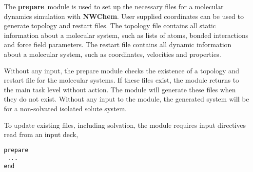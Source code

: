 \label{sec:prepare}
\def\bmu{\mbox{\boldmath $\mu$}}
\def\bE{\mbox{\bf E}}
\def\br{\mbox{\bf r}}
\def\tT{\tilde{T}}
\def\t{\tilde{1}}
\def\ip{i\prime}
\def\jp{j\prime}
\def\ipp{i\prime\prime}
\def\jpp{j\prime\prime}
\def\etal{{\sl et al.}}
\def\nwchem{{\bf NWChem}}
\def\nwargos{{\bf nwargos}}
\def\nwtop{{\bf nwtop}}
\def\nwrst{{\bf nwrst}}
\def\nwsgm{{\bf nwsgm}}
\def\esp{{\bf esp}}
\def\md{{\bf md}}
\def\prepare{{\bf prepare}}
\def\argos{{\bf ARGOS}}
\def\amber{{\bf AMBER}}
\def\charmm{{\bf CHARMM}}

The \prepare\ module is used to set up the necessary files for a molecular
dynamics simulation with \nwchem. User supplied coordinates can be used to
generate topology and restart files. The topology file contains all static
information about a molecular system, such as lists of atoms, bonded
interactions and force field parameters. The restart file contains all
dynamic information about a molecular system, such as coordinates, velocities
and properties.

Without any input, the prepare module checks the existence of a topology
and restart file for the molecular systems. If these files exist, the module
returns to the main task level without action. The module will generate these 
files when they do not exist. Without any input to the module, the generated 
system will be for a non-solvated isolated solute system.

To update existing files, including solvation, the module requires input
directives read from an input deck,

\begin{verbatim}
prepare
 ...
end
\end{verbatim}

